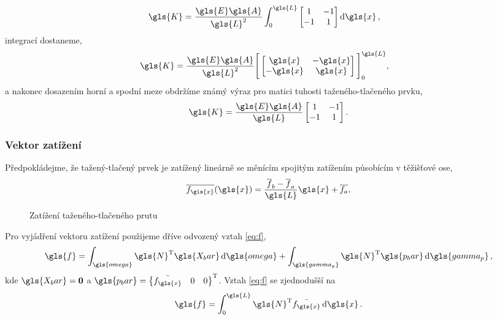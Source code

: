 \begin{align*}
    \gls{K} &= \frac{\gls{E}\gls{A}}{\gls{L}^2}\int_{0}^{\gls{L}}
    \begin{bmatrix}
    1 & -1 \\
    -1 & 1    
    \end{bmatrix}
    \dd{\gls{x}},
\end{align*}
integrací dostaneme,
\begin{align*}
    \gls{K} &= \frac{\gls{E}\gls{A}}{\gls{L}^2}
    \Bigg[
    \begin{bmatrix}
    \gls{x} & -\gls{x} \\
    -\gls{x} & \gls{x}    
    \end{bmatrix}
    \Bigg]_{0}^{\gls{L}},
\end{align*}
a nakonec dosazením horní a spodní meze obdržíme známý výraz pro matici tuhosti taženého-tlačeného prvku,
\begin{equation}
    \gls{K} = \frac{\gls{E}\gls{A}}{\gls{L}}
    \begin{bmatrix}
        1 & -1 \\
        -1 & 1
    \end{bmatrix}.
\end{equation}

\subsubsection*{Vektor zatížení}

Předpokládejme, že tažený-tlačený prvek je zatížený lineárně se měnícím spojitým zatížením působícím v těžišťové ose,
\begin{equation}
    \overline{f_{\gls{x}}}(\gls{x}) = \frac{\overline{f}_b - \overline{f}_a}{\gls{L}} \gls{x} + \overline{f_a},
\end{equation}
\begin{figure}[H]
    
    \caption{Zatížení taženého-tlačeného prutu}
    \label{fig:bar_load}
\end{figure}

Pro vyjádření vektoru zatížení použijeme dříve odvozený vztah \ref{eq:f},
\begin{equation*}
    \gls{f} = \int_{\gls{omega}} \gls{N}^{\mathrm{T}} \gls{X_bar} \dd{\gls{omega}} + \int_{\gls{gamma_p}} \gls{N}^{\mathrm{T}} \gls{p_bar} \dd{\gls{gamma_p}},
\end{equation*}
kde $\gls{X_bar} = \matr{0}$ a $\gls{p_bar} = \begin{Bmatrix}\bar{f_{\gls{x}}} & 0 & 0\end{Bmatrix}^{\mathrm{T}}$.
Vztah \ref{eq:f} se zjednodušší na
\begin{equation}
    \gls{f} = \int_{0}^{\gls{L}} \gls{N}^{\mathrm{T}} \bar{f_{\gls{x}}} \dd{\gls{x}}.
\end{equation}

